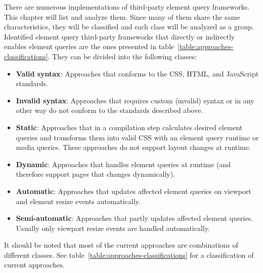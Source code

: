 \documentclass[a4paper,11pt]{kth-mag}
\begin{document}
      There are numerous implementations of third-party element query frameworks. This chapter will list and analyze them.
      Since many of them share the same characteristics, they will be classified and each class will be analyzed as a group.
      Identified element query third-party frameworks that directly or indirectly enables element queries are the ones presented in table~\ref{table:approaches-classifications}.
      They can be divided into the following classes:
      \begin{itemize}
        \item \textbf{Valid syntax}: Approaches that conforms to the \gls{CSS}, \gls{HTML}, and \gls{JavaScript} standards.
        \item \textbf{Invalid syntax}: Approaches that requires custom (invalid) syntax or in any other way do not conform to the standards described above.
        \item \textbf{Static}: Approaches that in a compilation step calculates desired element queries and transforms them into valid \gls{CSS} with an element query runtime or media queries. These approaches do not support layout changes at runtime.
        \item \textbf{Dynamic}: Approaches that handles element queries at runtime (and therefore support pages that changes dynamically).
        \item \textbf{Automatic}: Approaches that updates affected element queries on viewport and element resize events automatically.
        \item \textbf{Semi-automatic}: Approaches that partly updates affected element queries. Usually only viewport resize events are handled automatically.
      \end{itemize}
      It should be noted that most of the current approaches are combinations of different classes.
      See table~\ref{table:approaches-classifications} for a classification of current approaches.
\end{document}
